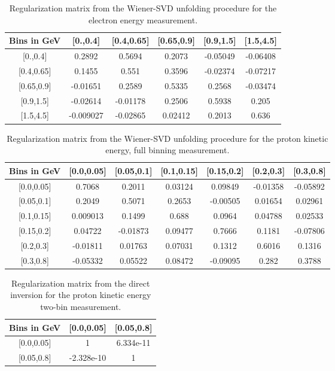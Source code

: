 \documentclass[amsmath,amssymb,aps,prd,showpacs,twocolumn,superscriptaddress,letterpaper,longbibliography, floatfix]{revtex4-2}
\begin{document}
\begin{table}[H]
\caption{Regularization matrix from the Wiener-SVD unfolding procedure for the electron energy measurement.} \label{tbl:ACEe}
\begin{center} \begin{tabular}{|c|c|c|c|c|c|}
\hline
Bins in GeV & [0.,0.4] & [0.4,0.65]& [0.65,0.9]& [0.9,1.5]& [1.5,4.5]\\\hline
{[0.,0.4]} &0.2892 &	0.5694&	0.2073&-0.05049	&-0.06408 	\\
{[0.4,0.65]}  &0.1455& 0.551& 0.3596& -0.02374&-0.07217 \\
{[0.65,0.9]}  &-0.01651& 0.2589& 0.5335&0.2568 &-0.03474  \\
{[0.9,1.5]}  &-0.02614& -0.01178 & 0.2506& 0.5938&0.205  \\
{[1.5,4.5]}  &-0.009027 & -0.02865&0.02412 & 0.2013&0.636  \\
\hline
\end{tabular} \end{center}
\end{table}
\FloatBarrier
\begin{table}[H]
\caption{Regularization matrix from the Wiener-SVD unfolding procedure for the proton kinetic energy, full binning measurement.} \label{tbl:ACPe}
\begin{center} \begin{tabular}{|c|c|c|c|c|c|c|}
\hline
Bins in GeV & [0.0,0.05] & [0.05,0.1]& [0.1,0.15]& [0.15,0.2]& [0.2,0.3]& [0.3,0.8]\\\hline
{[0.0,0.05]} & 0.7068&0.2011	&0.03124	&	0.09849&-0.01358 	& -0.05892 \\
{[0.05,0.1]}  &0.2049& 0.5071&0.2653 &  -0.00505& 0.01654& 0.02961\\
{[0.1,0.15]}  &0.009013&0.1499 & 0.688& 0.0964&0.04788 & 0.02533\\
{[0.15,0.2]}  &0.04722& -0.01873 &0.09477 &0.7666 &0.1181 & -0.07806  \\
{[0.2,0.3]}  &-0.01811 &0.01763 & 0.07031&0.1312 &0.6016 &0.1316 \\
{[0.3,0.8]}  & -0.05332 & 0.05522&0.08472 &-0.09095 & 0.282&0.3788 \\
\hline
\end{tabular} \end{center}
\end{table}
\FloatBarrier
\begin{table}[H]
\caption{Regularization matrix from the direct inversion for the proton kinetic energy two-bin measurement.} \label{tbl:ACPe2}
\begin{center} \begin{tabular}{|c|c|c|}
\hline
Bins in GeV & [0.0,0.05] & [0.05,0.8]\\ \hline
{[0.0,0.05]} & 1&	6.334e-11 	\\
{[0.05,0.8]}  &-2.328e-10 &  1 \\
\hline
\end{tabular} \end{center}
\end{table}
\end{document}
